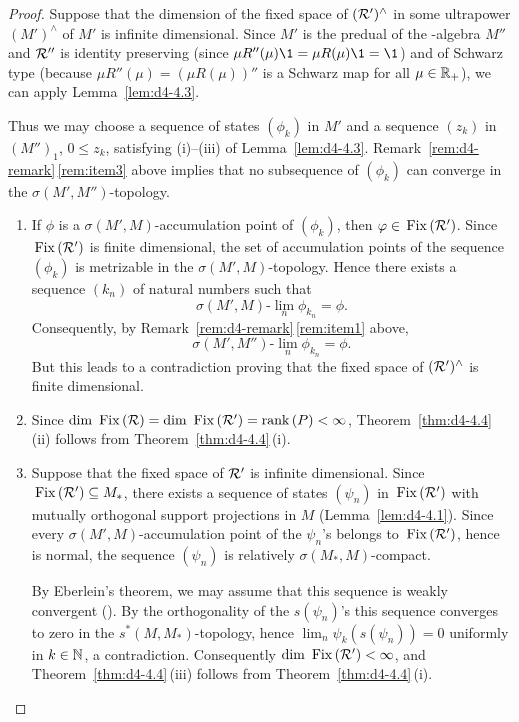 \begin{proof}
Suppose that the dimension of the fixed space of\/ 
$ (\mathcal{R}')^{\wedge} $  in some ultrapower $ (M')^{\wedge} $  of\/ $ M' $  is infinite dimensional.
Since $ M' $ is the predual of the \WA-algebra $ M'' $  and $ \mathcal{R}'' $  is identity preserving (since $ \mu R''(\mu)\1 = \mu R(\mu)\1 = \1 $) and of Schwarz type (because $ \mu R''(\mu) = (\mu R(\mu))'' $  is a Schwarz map for all $ \mu \in \mathbb{R}_{+} $), we can apply Lemma~\ref{lem:d4-4.3}.

Thus we may choose a sequence of states $ (\phi_{k}) $  in $ M' $  and a sequence $ (z_{k}) $  in $ (M'')_{1}$, $ 0 \leq z_{k} $,  satisfying (i)--(iii) of Lemma~\ref{lem:d4-4.3}.
Remark~\ref{rem:d4-remark}\,\ref{rem:item3} above implies that no subsequence of\/ $ (\phi_{k}) $  can converge in the $ \sigma(M',M'') $-topology.
\begin{enumerate}[\upshape (i), wide, labelindent=.25em]
\item
If\/ $ \phi $  is a $ \sigma(M',M) $-accumulation point of\/ $ (\phi_{k}) $, then $ \phi \in \Fix{\RR'} $.
Since $ \mathop{}\mathrm{Fix}\left(\mathcal{R}'\right) $  is finite dimensional, the set of accumulation points of the sequence $ (\phi_{k}) $  is metrizable in the $ \sigma(M',M) $-topology.
Hence there exists a sequence $ (k_{n}) $  of natural numbers such that 
\[
    \sigma(M',M)\text{-}\lim_{n} \phi_{k_{n}} = \phi .
\]
Consequently, by Remark~\ref{rem:d4-remark}\,\ref{rem:item1} above, 
\[ 
    \sigma(M',M'')\text{-}\lim_{n} \phi_{k_{n}}= \phi .
\]
But this leads to a contradiction proving that the fixed space of\/ $ (\mathcal{R}')^{\wedge} $  is finite dimensional.

\item
Since $ \mathop{}\!\mathrm{dim}\, \mathop{}\mathrm{Fix}\left(\mathcal{R}\right) = \mathop{}\!\mathrm{dim}\, \mathop{}\mathrm{Fix}\left(\mathcal{R}'\right) = \mathop{}\!\mathrm{rank}\,(P) < \infty $, Theorem~\ref{thm:d4-4.4}\,(ii) follows from Theorem~\ref{thm:d4-4.4}\,(i).

\item
Suppose that the fixed space of\/ $ \mathcal{R}' $  is infinite dimensional.
Since $ \mathop{}\mathrm{Fix}\left(\mathcal{R}'\right) \subseteq M_{*} $,  there exists a sequence of states $ (\psi_{n}) $  in $ \mathop{}\mathrm{Fix}\left(\mathcal{R}'\right) $  with mutually orthogonal support projections in $ M $  (Lemma~\ref{lem:d4-4.1}).
Since every $ \sigma(M',M) $-accumulation point of the $ \psi_{n} $'s belongs to $ \mathop{}\mathrm{Fix}\left(\mathcal{R}'\right) $, hence is normal, the sequence $ (\psi_{n}) $  is relatively $ \sigma(M_{*},M) $-compact.

By Eberlein's theorem, we may assume that this sequence is weakly convergent (\textcite{schaefer:1966}).
By the orthogonality of the $ s(\psi_{n}) $'s this sequence converges to zero in the $ s^{*}(M,M_{*}) $-topology, hence $ \lim_{n} \psi_{k}(s(\psi_{n})) = 0 $  uniformly in $ k \in \mathbb{N} $, a contradiction.
Consequently $ \mathop{}\!\mathrm{dim}\, \mathop{}\mathrm{Fix}\left(\mathcal{R}'\right) < \infty $, and Theorem~\ref{thm:d4-4.4}\,(iii) follows from Theorem~\ref{thm:d4-4.4}\,(i).


\end{enumerate}
\end{proof}
